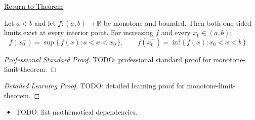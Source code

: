 \newpage
{}
\label{prf:monotone-limit-theorem}

\begin{remark*}[Return]
\hyperref[thm:monotone-limit-theorem]{Return to Theorem}
\end{remark*}

\begin{theorem*}
Let $a < b$ and let $f : (a,b) \to \mathbb{R}$ be monotone and
bounded. Then both one-sided limits exist at every interior point.
For increasing $f$ and every $x_0 \in (a,b)$:
\[
  f(x_0^-) = \sup\{\,f(x) : a < x < x_0\,\},
  \qquad
  f(x_0^+) = \inf\{\,f(x) : x_0 < x < b\,\}.
\]

\smallskip\noindent
\end{theorem*}

\begin{proof}[Professional Standard Proof]
\LRAProofBodyStart
TODO: professional standard proof for monotone-limit-theorem.
\end{proof}

\begin{proof}[Detailed Learning Proof]
\LRAProofBodyStart
TODO: detailed learning proof for monotone-limit-theorem.
\end{proof}

\begin{remark*}
\end{remark*}

\begin{dependencies}
\begin{itemize}
  \item TODO: list mathematical dependencies.
\end{itemize}
\end{dependencies}

\clearpage
